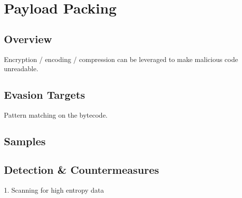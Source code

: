 \section{Payload Packing} \label{sec:packing}

\subsection{Overview}

Encryption / encoding / compression can be leveraged to make malicious code unreadable.

\subsection{Evasion Targets}

Pattern matching on the bytecode.

\subsection{Samples}

\subsection{Detection \& Countermeasures}

1. Scanning for high entropy data
